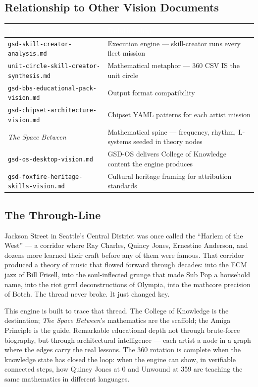 \documentclass[11pt,letterpaper]{article}
\newcommand{\tblhdr}[1]{\textbf{\sffamily\textcolor{white}{#1}}}
\begin{document}
\subsection{Relationship to Other Vision Documents}

\begin{center}
\begin{tabularx}{\textwidth}{L{6cm}X}
\toprule
{}
\tblhdr{Document} & \tblhdr{Relationship} \\
\midrule
\texttt{gsd-skill-creator-analysis.md} & Execution engine — skill-creator runs every fleet mission \\
\texttt{unit-circle-skill-creator-synthesis.md} & Mathematical metaphor — 360\textdegree{} CSV IS the unit circle \\
\texttt{gsd-bbs-educational-pack-vision.md} & Output format compatibility \\
\texttt{gsd-chipset-architecture-vision.md} & Chipset YAML patterns for each artist mission \\
\textit{The Space Between} & Mathematical spine — frequency, rhythm, L-systems seeded in theory nodes \\
\texttt{gsd-os-desktop-vision.md} & GSD-OS delivers College of Knowledge content the engine produces \\
\texttt{gsd-foxfire-heritage-skills-vision.md} & Cultural heritage framing for attribution standards \\
\bottomrule
\end{tabularx}
\end{center}

\subsection{The Through-Line}

Jackson Street in Seattle's Central District was once called the ``Harlem of the West'' ---
a corridor where Ray Charles, Quincy Jones, Ernestine Anderson, and dozens more learned
their craft before any of them were famous. That corridor produced a theory of music
that flowed forward through decades: into the ECM jazz of Bill Frisell, into the
soul-inflected grunge that made Sub Pop a household name, into the riot grrrl
deconstructions of Olympia, into the mathcore precision of Botch. The thread never broke.
It just changed key.

This engine is built to trace that thread. The College of Knowledge is the destination;
\textit{The Space Between}'s mathematics are the scaffold; the Amiga Principle is the guide.
Remarkable educational depth not through brute-force biography, but through architectural
intelligence --- each artist a node in a graph where the edges carry the real lessons.
The 360\textdegree{} rotation is complete when the knowledge state has closed the loop: when the
engine can show, in verifiable connected steps, how Quincy Jones at 0\textdegree{} and Unwound at
359\textdegree{} are teaching the same mathematics in different languages.
\end{document}
